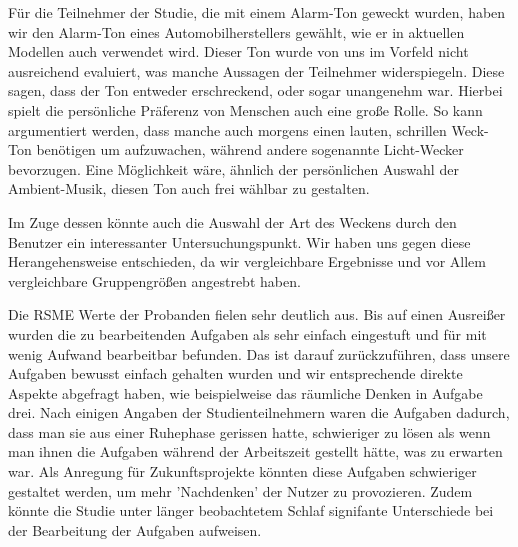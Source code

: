 

Für die Teilnehmer der Studie, die mit einem Alarm-Ton geweckt wurden, haben wir den Alarm-Ton eines Automobilherstellers gewählt, wie er in aktuellen Modellen auch verwendet wird.
Dieser Ton wurde von uns im Vorfeld nicht ausreichend evaluiert, was manche Aussagen der Teilnehmer widerspiegeln.
Diese sagen, dass der Ton entweder erschreckend, oder sogar unangenehm war.
Hierbei spielt die persönliche Präferenz von Menschen auch eine große Rolle. So kann argumentiert werden, dass manche auch morgens einen lauten, schrillen Weck-Ton benötigen um aufzuwachen, während andere sogenannte Licht-Wecker bevorzugen. Eine Möglichkeit wäre, ähnlich der persönlichen Auswahl der Ambient-Musik, diesen Ton auch frei wählbar zu gestalten. 

Im Zuge dessen könnte auch die Auswahl der Art des Weckens durch den Benutzer ein interessanter Untersuchungspunkt. Wir haben uns gegen diese Herangehensweise entschieden, da wir vergleichbare Ergebnisse und vor Allem vergleichbare Gruppengrößen angestrebt haben.

Die RSME Werte der Probanden fielen sehr deutlich aus. Bis auf einen Ausreißer wurden die zu bearbeitenden Aufgaben als sehr einfach eingestuft und für mit wenig Aufwand bearbeitbar befunden. Das ist darauf zurückzuführen, dass unsere Aufgaben bewusst einfach gehalten wurden und wir entsprechende direkte Aspekte abgefragt haben, wie beispielweise das räumliche Denken in Aufgabe drei. Nach einigen Angaben der Studienteilnehmern waren die Aufgaben dadurch, dass man sie aus einer Ruhephase gerissen hatte, schwieriger zu lösen als wenn man ihnen die Aufgaben während der Arbeitszeit gestellt hätte, was zu erwarten war. Als Anregung für Zukunftsprojekte könnten diese Aufgaben schwieriger gestaltet werden, um mehr 'Nachdenken' der Nutzer zu provozieren. Zudem könnte die Studie unter länger beobachtetem Schlaf signifante Unterschiede bei der Bearbeitung der Aufgaben aufweisen.
